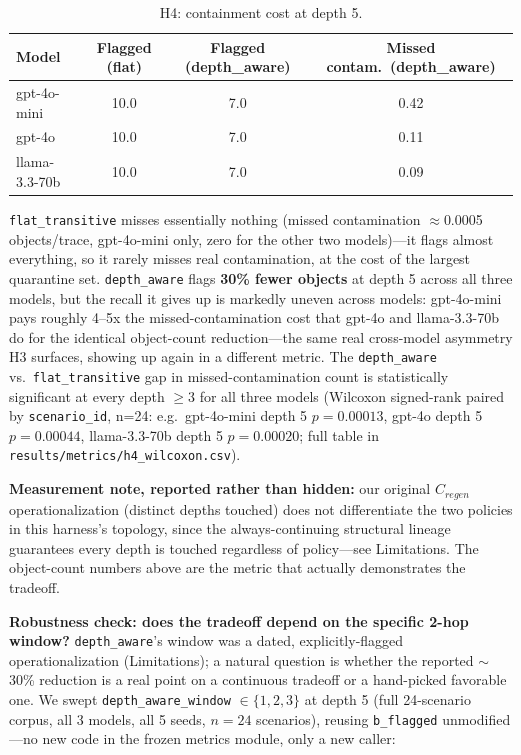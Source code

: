 \begin{table}[!t]
\centering
\caption{H4: containment cost at depth 5.}
\label{tab:h4}
\begin{tabular}{lccc}
\toprule
Model & Flagged (flat) & Flagged (depth\_aware) & Missed contam.\ (depth\_aware) \\
\midrule
gpt-4o-mini & 10.0 & 7.0 & 0.42 \\
gpt-4o & 10.0 & 7.0 & 0.11 \\
llama-3.3-70b & 10.0 & 7.0 & 0.09 \\
\bottomrule
\end{tabular}
\end{table}

\texttt{flat\_transitive} misses essentially nothing (missed
contamination $\approx$0.0005 objects/trace, gpt-4o-mini only, zero for
the other two models)---it flags almost everything, so it rarely
misses real contamination, at the cost of the largest quarantine set.
\texttt{depth\_aware} flags \textbf{30\% fewer objects} at depth 5
across all three models, but the recall it gives up is markedly uneven
across models: gpt-4o-mini pays roughly 4--5x the missed-contamination
cost that gpt-4o and llama-3.3-70b do for the identical object-count
reduction---the same real cross-model asymmetry H3 surfaces, showing up
again in a different metric. The \texttt{depth\_aware} vs.\
\texttt{flat\_transitive} gap in missed-contamination count is
statistically significant at every depth $\geq$3 for all three models
(Wilcoxon signed-rank paired by \texttt{scenario\_id}, n=24: e.g.\
gpt-4o-mini depth 5 $p = 0.00013$, gpt-4o depth 5 $p = 0.00044$,
llama-3.3-70b depth 5 $p = 0.00020$; full table in
\texttt{results/metrics/h4\_wilcoxon.csv}).

\textbf{Measurement note, reported rather than hidden:} our original
$C_{regen}$ operationalization (distinct depths touched) does not
differentiate the two policies in this harness's topology, since the
always-continuing structural lineage guarantees every depth is touched
regardless of policy---see Limitations. The object-count numbers above
are the metric that actually demonstrates the tradeoff.

\textbf{Robustness check: does the tradeoff depend on the specific
2-hop window?} \texttt{depth\_aware}'s window was a dated,
explicitly-flagged operationalization (Limitations); a natural
question is whether the reported $\sim$30\% reduction is a real point
on a continuous tradeoff or a hand-picked favorable one. We swept
\texttt{depth\_aware\_window} $\in \{1, 2, 3\}$ at depth 5 (full
24-scenario corpus, all 3 models, all 5 seeds, $n=24$ scenarios),
reusing \texttt{b\_flagged} unmodified---no new code in the frozen
metrics module, only a new caller:


